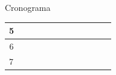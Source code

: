 \begin{frame}[allowframebreaks]{Cronograma}
\begin{table}[!htbp]
\begin{tabular}{|c|c|c|c|c|c|c|c|c|c|c|c|}
			5                       &                          &                          &                                                 &                                                 &                          &                          &                          & \cellcolor[HTML]{000000} & \cellcolor[HTML]{FFFFFF} &                          &                                               \\ \hline
			6                       &                          &                          &                                                 &                                                 &                          &                          &                          & \cellcolor[HTML]{000000} & \cellcolor[HTML]{000000} & \cellcolor[HTML]{000000} &                                               \\ \hline
			\multicolumn{1}{|l|}{7} & \multicolumn{1}{l|}{}    & \multicolumn{1}{l|}{}    & \multicolumn{1}{l|}{}                           & \multicolumn{1}{l|}{}                           & \multicolumn{1}{l|}{}    & \multicolumn{1}{l|}{}    & \multicolumn{1}{l|}{}    & \multicolumn{1}{l|}{}    & \multicolumn{1}{l|}{}    & \multicolumn{1}{l|}{}    & \multicolumn{1}{l|}{\cellcolor[HTML]{000000}} \\ \hline
		\end{tabular}
	\end{table}
	
	
	
\end{frame}







